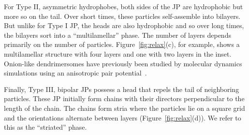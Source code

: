 \documentclass[prb,preprint,showpacs,preprintnumbers,amsmath,amssymb,longbibliography]{revtex4-1}
\begin{document}
For Type II, asymmetric hydrophobes,
both sides of the JP are hydrophobic but more so on the tail.
Over short times, these particles self-assemble into bilayers. But unlike for
Type I JP, the heads are also hydrophobic and so over long times, 
the bilayers sort into a ``multilamellar'' phase.
The number of layers depends primarily on the number of particles.
Figure~\ref{fig:relax}(c), for example, shows a multilamellar structure
with four layers and one with two layers in the inset.
Onion-like dendrimersomes have previously been studied by molecular dynamics
simulations using an 
anisotropic pair potential~\cite{C9NR05885K,HongCacciutoLuijtenGranick2008}.

Finally, Type III, bipolar JPs possess a
head that repels the tail of neighboring particles.
These JP initially form chains with
their directors perpendicular to the length of the chain. The chains
form stria where the particles lie on a square grid and the orientations
alternate between layers (Figure~\ref{fig:relax}(d)).
We refer to this as the ``striated'' phase. 


\end{document}
